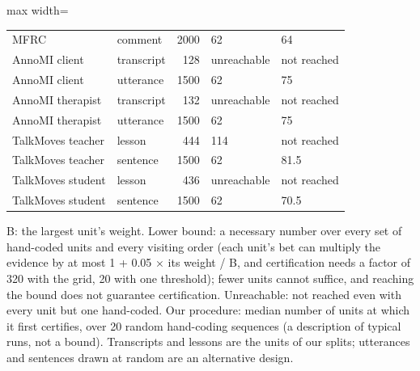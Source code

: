 \begin{table}[t]
\begin{adjustbox}{max width=\linewidth}
\begin{tabular}{llrll}
\midrule
MFRC & comment & 2000 & 62 & 64 \\
AnnoMI client & transcript & 128 & unreachable & not reached \\
AnnoMI client & utterance & 1500 & 62 & 75 \\
AnnoMI therapist & transcript & 132 & unreachable & not reached \\
AnnoMI therapist & utterance & 1500 & 62 & 75 \\
TalkMoves teacher & lesson & 444 & 114 & not reached \\
TalkMoves teacher & sentence & 1500 & 62 & 81.5 \\
TalkMoves student & lesson & 436 & unreachable & not reached \\
TalkMoves student & sentence & 1500 & 62 & 70.5 \\
\bottomrule
\end{tabular}
\end{adjustbox}
\par\smallskip\footnotesize\raggedright B: the largest unit's weight. Lower bound: a necessary number over every set of hand-coded units and every visiting order (each unit's bet can multiply the evidence by at most 1 + 0.05 $\times$ its weight / B, and certification needs a factor of 320 with the grid, 20 with one threshold); fewer units cannot suffice, and reaching the bound does not guarantee certification. Unreachable: not reached even with every unit but one hand-coded. Our procedure: median number of units at which it first certifies, over 20 random hand-coding sequences (a description of typical runs, not a bound). Transcripts and lessons are the units of our splits; utterances and sentences drawn at random are an alternative design.
\end{table}
